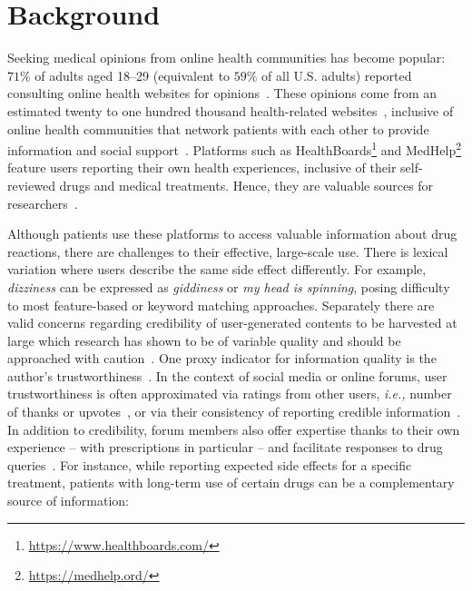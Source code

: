 \documentclass{bmcart}
\begin{document}


\section{Background}\label{sec:background}

Seeking medical opinions from online health communities has become popular: $71\%$ of adults aged 18--29 (equivalent to $59\%$ of all
U.S. adults) reported consulting online health
websites for opinions~\cite{fox2013health}.  These opinions come from an estimated
twenty to one hundred thousand health-related
websites~\cite{diaz2002patients}, inclusive of online health
communities that network patients with each other to provide
information and social support~\cite{johnston2013online}. Platforms
such as
HealthBoards\footnote{\scriptsize{\url{https://www.healthboards.com/}}}
and MedHelp\footnote{{\scriptsize{\url{https://medhelp.ord/}}}}
feature users reporting their own health experiences, inclusive of
their self-reviewed drugs and medical treatments.  Hence, they are
valuable sources for researchers~\cite{leyens2017use,martin2014big}.

Although patients use these platforms to access valuable information about drug reactions, there are challenges to their effective, large-scale use. There is lexical variation where users describe the same side effect differently.  For example, \textit{dizziness} can be expressed as
\textit{giddiness} or \textit{my head is spinning}, posing difficulty to most feature-based or keyword matching approaches. Separately there are valid concerns regarding credibility of user-generated contents to be harvested at large which research
has shown to be of variable quality and should be approached with caution~\cite{impicciatore1997reliability,peterson2003consumers,hajli2015credibility,poddar2019}. One proxy indicator for information quality is the author's trustworthiness~\cite{li2016survey}. In the context of social media or online forums, user trustworthiness is 
often approximated via ratings from other users, \textit{i.e.,} number of thanks or upvotes~\cite{rains2009health}, or via their consistency of reporting credible information~\cite{hoang2018authenticity,mukherjee2014people}. In addition to credibility, forum members also offer expertise thanks to their own experience -- with prescriptions in particular -- and facilitate responses to drug queries~\cite{vydiswaran2019identifying}. For instance, while reporting expected side effects for a specific treatment, patients with long-term use of certain drugs can be a complementary source of information:  %
\end{document}

